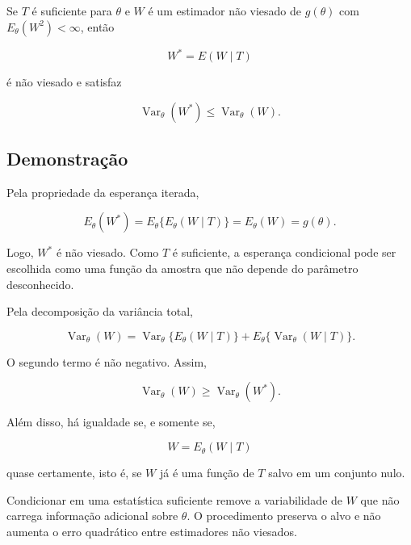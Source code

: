 \documentclass[
  letterpaper,
  DIV=11,
  numbers=noendperiod]{scrreprt}
\begin{document}
Se \(T\) é suficiente para \(\theta\) e \(W\) é um estimador não viesado
de \(g(\theta)\) com \(E_\theta(W^2)<\infty\), então

\[
W^*=E(W\mid T)
\]

é não viesado e satisfaz

\[
\operatorname{Var}_\theta(W^*)
\leq
\operatorname{Var}_\theta(W).
\]

\subsection*{Demonstração}\label{demonstrauxe7uxe3o-7}

Pela propriedade da esperança iterada,

\[
E_\theta(W^*)
=
E_\theta\{E_\theta(W\mid T)\}
=
E_\theta(W)
=
g(\theta).
\]

Logo, \(W^*\) é não viesado. Como \(T\) é suficiente, a esperança
condicional pode ser escolhida como uma função da amostra que não
depende do parâmetro desconhecido.

Pela decomposição da variância total,

\[
\operatorname{Var}_\theta(W)
=
\operatorname{Var}_\theta\{E_\theta(W\mid T)\}
+
E_\theta\{\operatorname{Var}_\theta(W\mid T)\}.
\]

O segundo termo é não negativo. Assim,

\[
\operatorname{Var}_\theta(W)
\geq
\operatorname{Var}_\theta(W^*).
\]

Além disso, há igualdade se, e somente se,

\[
W=E_\theta(W\mid T)
\]

quase certamente, isto é, se \(W\) já é uma função de \(T\) salvo em um
conjunto nulo.

\begin{tcolorbox}[enhanced jigsaw, colback=white, leftrule=.75mm, colbacktitle=quarto-callout-tip-color!10!white, breakable, titlerule=0mm, bottomtitle=1mm, title=\textcolor{quarto-callout-tip-color}{\faLightbulb}\hspace{0.5em}{Interpretação}, colframe=quarto-callout-tip-color-frame, toprule=.15mm, opacityback=0, bottomrule=.15mm, opacitybacktitle=0.6, arc=.35mm, toptitle=1mm, rightrule=.15mm, coltitle=black, left=2mm]

Condicionar em uma estatística suficiente remove a variabilidade de
\(W\) que não carrega informação adicional sobre \(\theta\). O
procedimento preserva o alvo e não aumenta o erro quadrático entre
estimadores não viesados.

\end{tcolorbox}
\end{document}
